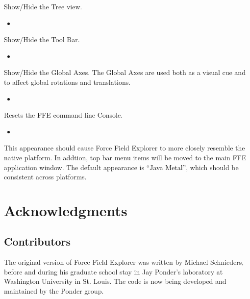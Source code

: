 \documentclass[letterpaper,11pt,english]{sphinxmanual}
\begin{document}
Show/Hide the Tree view.
\begin{itemize}
\item {} 

\end{itemize}

Show/Hide the Tool Bar.
\begin{itemize}
\item {} 

\end{itemize}

Show/Hide the Global Axes. The Global Axes are used both as a visual cue and to affect global rotations and translations.
\begin{itemize}
\item {} 

\end{itemize}

Resets the FFE command line Console.
\begin{itemize}
\item {} 

\end{itemize}

This appearance should cause Force Field Explorer to more closely resemble the native platform. In addtion, top bar menu items will be moved to the main FFE application window. The default appearance is “Java Metal”, which should be consistent across platforms.


\chapter{Acknowledgments}
\label{\detokenize{text/acknowledgements:acknowledgments}}\label{\detokenize{text/acknowledgements::doc}}

\section{Contributors}
\label{\detokenize{text/acknowledgements:contributors}}
The original version of Force Field Explorer was written by Michael Schnieders, before and during his graduate school stay in Jay Ponder’s laboratory at Washington University in St. Louis. The code is now being developed and maintained by the Ponder group.
\end{document}
